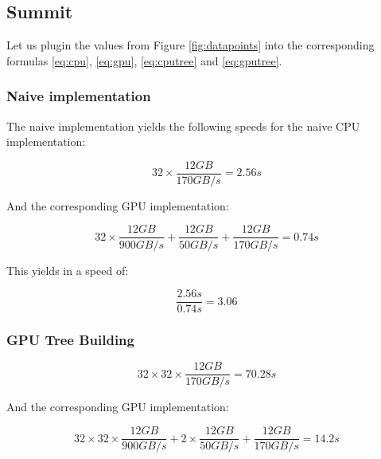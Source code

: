 \documentclass[]{article}
\begin{document}
\vspace{5mm}


\subsection{Summit}

Let us plugin the values from Figure \ref{fig:datapoints} into the corresponding formulas \ref{eq:cpu}, \ref{eq:gpu}, \ref{eq:cputree} and \ref{eq:gputree}.

\subsubsection{Naive implementation}
The naive implementation yields the following speeds for the naive CPU  implementation:

\begin{center}
	\begin{equation}
		32 \times \frac{ 12 GB }{170 GB/s} = 2.56s
	\end{equation}
\end{center}

And the corresponding GPU implementation:
\begin{center}
	\begin{equation}
		32 \times \frac{12 GB}{900 GB/s} + \frac{12 GB}{50 GB/s}  + \frac{12 GB}{170 GB/s} = 0.74s
	\end{equation}
\end{center}

This yields in a speed of:
\begin{center}
	\begin{equation}
		\frac{2.56s}{0.74s} = 3.06
	\end{equation}
\end{center}


\subsubsection{GPU Tree Building}

\begin{center}
	\begin{equation}
		32 \times 32 \times \frac{ 12 GB }{170 GB/s} = 70.28s
	\end{equation}
\end{center}

And the corresponding GPU implementation:
\begin{center}
	\begin{equation}
		32 \times 32 \times \frac{12 GB}{900 GB/s} + 2 \times \frac{12 GB}{50 GB/s}  + \frac{12 GB}{170 GB/s} = 14.2s
	\end{equation}
\end{center}
\end{document}
